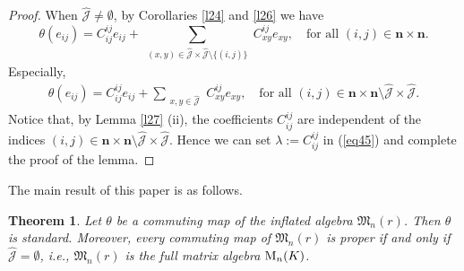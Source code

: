 \documentclass[reqno]{amsart}
\theoremstyle{plain}
\newtheorem{theorem}{Theorem}[section]
\theoremstyle{definition}
\begin{document}
\begin{proof}
When $ \hat{\mathcal{J}} \neq \emptyset $, by Corollaries \ref{l24} and \ref{l26} we have
\[
\theta(e_{ij}) = C_{ij}^{ij} e_{ij} + \sum_{\substack{(x,y) \in \hat{\mathcal{J}}\times \hat{\mathcal{J}} \setminus 
\{(i,j)\} }} C_{xy}^{ij} e_{xy}, \quad \text{for all } ( i,j) \in \mathbf{n} \times \mathbf{n}.
\]
Especially,
 \begin{align}\label{eq45}
\theta(e_{ij}) = C_{ij}^{ij} e_{ij} + \sum_{\substack{x,y \in \hat{\mathcal{J}}}} C_{xy}^{ij} e_{xy}, \quad \text{for all } ( i,j) \in \mathbf{n} \times \mathbf{n} \setminus \hat{\mathcal{J}} \times \hat{\mathcal{J}}. 
 \end{align}
Notice that, by Lemma \ref{l27} (ii), the coefficients
$C_{ij}^{ij}$ are independent of the indices $(i,j) \in \mathbf{n} \times \mathbf{n} \setminus \hat{\mathcal{J}} \times \hat{\mathcal{J}}$. Hence we can set
$\lambda:=C_{ij}^{ij}$ in (\ref{eq45}) and complete the proof of the lemma.
\end{proof}

The main result of this paper is as follows.
\begin{theorem}\label{l29}
Let $\theta$ be a commuting map of the inflated algebra $\mathfrak{M}_n(r)$. Then $\theta$ is standard. Moreover,
every commuting map of $\mathfrak{M}_n(r)$ is proper if and only if $\hat{\mathcal{J}} = \emptyset$, i.e., $\mathfrak{M}_n(r)$ is the full matrix algebra ${\rm M}_n(K)$.
\end{theorem}
\end{document}
